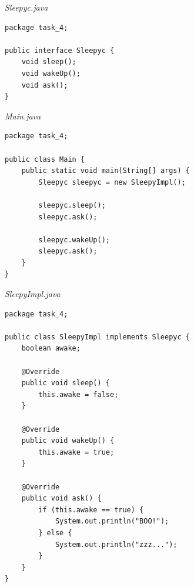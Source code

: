 \documentclass[a4paper]{article}
\begin{document}
\begin{minipage}{0.5\textwidth}
    \textit{Sleepyc.java}
    \begin{lstlisting}
package task_4;

public interface Sleepyc {
    void sleep();
    void wakeUp();
    void ask();
}
\end{lstlisting}
\textit{Main.java}
\begin{lstlisting}
package task_4;

public class Main {
    public static void main(String[] args) {
        Sleepyc sleepyc = new SleepyImpl();

        sleepyc.sleep();
        sleepyc.ask();

        sleepyc.wakeUp();
        sleepyc.ask();
    }
}
\end{lstlisting}
\end{minipage}
\hfill
\begin{minipage}{0.5\textwidth}
\textit{SleepyImpl.java}
\begin{lstlisting}
package task_4;

public class SleepyImpl implements Sleepyc {
    boolean awake;

    @Override
    public void sleep() {
        this.awake = false;
    }

    @Override
    public void wakeUp() {
        this.awake = true;
    }

    @Override
    public void ask() {
        if (this.awake == true) {
            System.out.println("BOO!");
        } else {
            System.out.println("zzz...");
        }
    }
}
    
\end{lstlisting}
\end{minipage}
\end{document}
